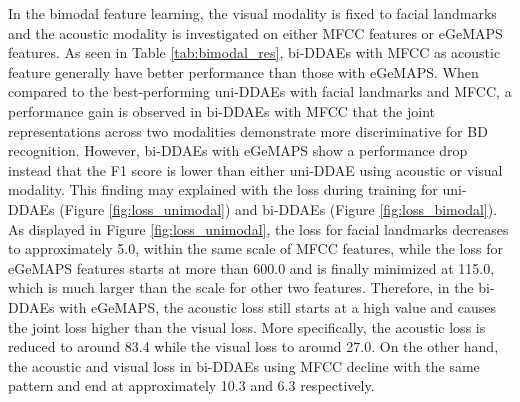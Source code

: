 In the bimodal feature learning, the visual modality is fixed to facial landmarks and the acoustic modality is investigated on either MFCC features or eGeMAPS features. As seen in Table \ref{tab:bimodal_res}, bi-DDAEs with MFCC as acoustic feature generally have better performance than those with eGeMAPS. When compared to the best-performing uni-DDAEs with facial landmarks and MFCC, a performance gain is observed in bi-DDAEs with MFCC that the joint representations across two modalities demonstrate more discriminative for BD recognition. However, bi-DDAEs with eGeMAPS show a performance drop instead that the F1 score is lower than either uni-DDAE using acoustic or visual modality. This finding may explained with the loss during training for uni-DDAEs (Figure \ref{fig:loss_unimodal}) and bi-DDAEs (Figure \ref{fig:loss_bimodal}). As displayed in Figure \ref{fig:loss_unimodal}, the loss for facial landmarks decreases to approximately 5.0, within the same scale of MFCC features, while the loss for eGeMAPS features starts at more than 600.0 and is finally minimized at 115.0, which is much larger than the scale for other two features. Therefore, in the bi-DDAEs with eGeMAPS, the acoustic loss still starts at a high value and causes the joint loss higher than the visual loss. More specifically, the acoustic loss is reduced to around 83.4 while the visual loss to around 27.0. On the other hand, the acoustic and visual loss in bi-DDAEs using MFCC decline with the same pattern and end at approximately 10.3 and 6.3 respectively.

